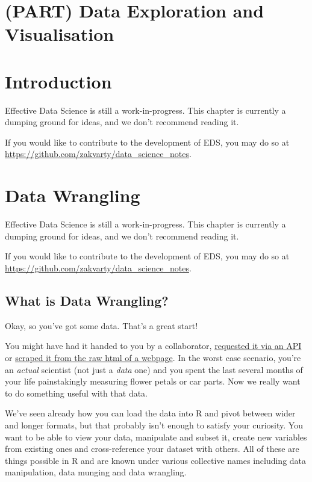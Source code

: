 \documentclass[
  12pt,
]{book}
\begin{document}
\hypertarget{part-data-exploration-and-visualisation}{%
\chapter{(PART) Data Exploration and Visualisation}\label{part-data-exploration-and-visualisation}}

\hypertarget{edav-introduction}{%
\chapter*{Introduction}\label{edav-introduction}}

Effective Data Science is still a work-in-progress. This chapter is currently a dumping ground for ideas, and we don't recommend reading it.

If you would like to contribute to the development of EDS, you may do so at \url{https://github.com/zakvarty/data_science_notes}.

\hypertarget{edav-wrangling}{%
\chapter{Data Wrangling}\label{edav-wrangling}}

Effective Data Science is still a work-in-progress. This chapter is currently a dumping ground for ideas, and we don't recommend reading it.

If you would like to contribute to the development of EDS, you may do so at \url{https://github.com/zakvarty/data_science_notes}.

\hypertarget{what-is-data-wrangling}{%
\section{What is Data Wrangling?}\label{what-is-data-wrangling}}

Okay, so you've got some data. That's a great start!

You might have had it handed to you by a collaborator, \protect\hyperlink{data-apis}{requested it via an API} or \protect\hyperlink{data-webscraping}{scraped it from the raw html of a webpage}. In the worst case scenario, you're an \emph{actual} scientist (not just a \emph{data} one) and you spent the last several months of your life painstakingly measuring flower petals or car parts. Now we really want to do something useful with that data.

We've seen already how you can load the data into R and pivot between wider and longer formats, but that probably isn't enough to satisfy your curiosity. You want to be able to view your data, manipulate and subset it, create new variables from existing ones and cross-reference your dataset with others. All of these are things possible in R and are known under various collective names including data manipulation, data munging and data wrangling.
\end{document}
